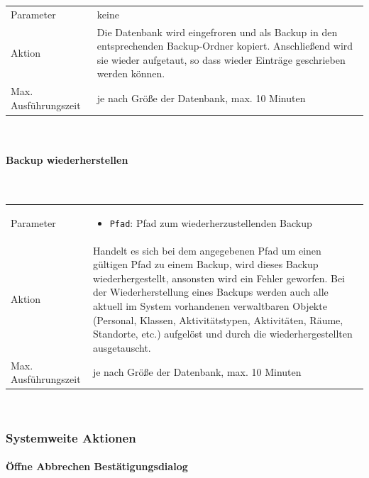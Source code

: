 \documentclass[fontsize=12pt,paper=a4,twoside]{scrartcl}
\begin{document}
\begin{tabularx}{\textwidth}{p{4cm}X}
Parameter & keine\\
Aktion & Die Datenbank wird eingefroren und als Backup in den entsprechenden Backup-Ordner kopiert. Anschließend wird sie wieder aufgetaut, so dass wieder Einträge geschrieben werden können. \\
Max. Ausführungszeit & je nach Größe der Datenbank, max. 10 Minuten 
\end{tabularx}\\



\paragraph{Backup wiederherstellen}\mbox{}\\

\begin{tabularx}{\textwidth}{p{4cm}X}
Parameter & \begin{itemize}
			\item \texttt{Pfad}: Pfad zum wiederherzustellenden Backup
			\end{itemize}\\
Aktion & Handelt es sich bei dem angegebenen Pfad um einen gültigen Pfad zu einem Backup, wird dieses Backup wiederhergestellt, ansonsten wird ein Fehler geworfen. Bei der Wiederherstellung eines Backups werden auch alle aktuell im System vorhandenen verwaltbaren Objekte (Personal, Klassen, Aktivitätstypen, Aktivitäten, Räume, Standorte, etc.) aufgelöst und durch die wiederhergestellten ausgetauscht.\\
Max. Ausführungszeit & je nach Größe der Datenbank, max. 10 Minuten 
\end{tabularx}\\


\subsubsection{Systemweite Aktionen}

\paragraph{Öffne Abbrechen Bestätigungsdialog}\mbox{}\\
\end{document}
